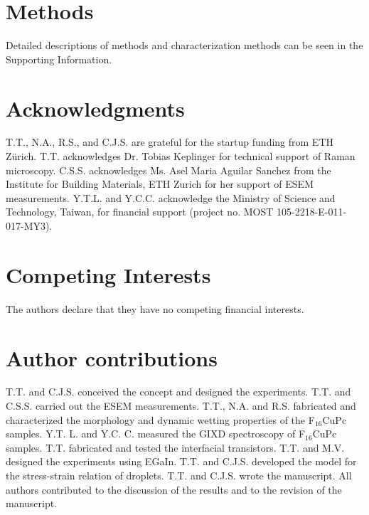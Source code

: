 \section*{Methods}
\label{sec:orgdf8ba2c}
Detailed descriptions of methods and characterization methods can be seen in the Supporting Information.

\section*{Acknowledgments}
\label{sec:org55f4639}
T.T., N.A., R.S., and C.J.S. are grateful for the startup funding
from ETH Z\"{u}rich. T.T. acknowledges Dr. Tobias Keplinger for
technical support of Raman microscopy. C.S.S. acknowledges Ms. Asel
Maria Aguilar Sanchez from the Institute for Building Materials, ETH
Zurich for her support of ESEM measurements. Y.T.L. and
Y.C.C. acknowledge the Ministry of Science and Technology, Taiwan,
for financial support (project no. MOST 105-2218-E-011-017-MY3).

\section*{Competing Interests}
\label{sec:org91f202c}
The authors declare that they have no competing financial interests.

\section*{Author contributions}
\label{sec:org12c3d57}
T.T. and C.J.S. conceived the concept and designed the
experiments. T.T. and C.S.S. carried out the ESEM
measurements. T.T., N.A. and R.S. fabricated and characterized the
morphology and dynamic wetting properties of the F\(_{\text{16}}\)CuPc
samples. Y.T. L. and Y.C. C. measured the GIXD spectroscopy of
F\(_{\text{16}}\)CuPc samples. T.T. fabricated and tested the interfacial
transistors. T.T. and M.V. designed the experiments using
EGaIn. T.T. and C.J.S. developed the model for the stress-strain
relation of droplets. T.T. and C.J.S. wrote the manuscript. All
authors contributed to the discussion of the results and to the
revision of the manuscript.



% 

\newpage{}

